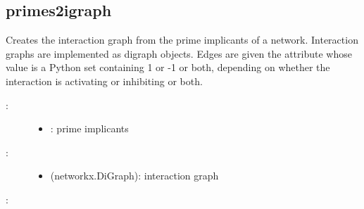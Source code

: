\documentclass[letterpaper,10pt,english]{sphinxmanual}
\begin{document}
\subsection{primes2igraph}
\label{\detokenize{InteractionGraphs:id2}}\label{\detokenize{InteractionGraphs:primes2igraph}}

\begin{fulllineitems}
\label{\detokenize{InteractionGraphs:PyBoolNet.InteractionGraphs.primes2igraph}}
Creates the interaction graph from the prime implicants of a network.
Interaction graphs are implemented as {\hyperref[\detokenize{Installation:installation-networkx}]{}} digraph objects.
Edges are given the attribute  whose value is a Python set containing 1 or -1 or both, depending on
whether the interaction is activating or inhibiting or both.
\begin{description}
\item[{:}] \leavevmode\begin{itemize}
\item {} 
: prime implicants

\end{itemize}

\item[{:}] \leavevmode\begin{itemize}
\item {} 
 (networkx.DiGraph): interaction graph

\end{itemize}

\end{description}

:


\end{fulllineitems}
\end{document}
